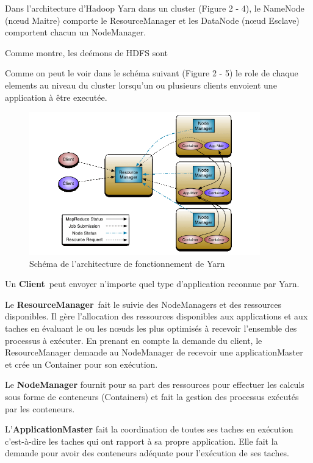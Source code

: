\documentclass[12pt,french]{book}
\begin{document}
Dans l’architecture d’Hadoop Yarn dans un cluster (Figure 2 - 4), le NameNode (nœud Maitre) comporte le ResourceManager et les DataNode (nœud Esclave) comportent chacun un NodeManager.

Comme montre, les deémons de HDFS sont

Comme on peut le voir dans le schéma suivant (Figure 2 - 5) le role de chaque elements au niveau du cluster lorsqu’un ou plusieurs clients envoient une application à être executée.

\begin{figure}[ht]
	\centering
	\includegraphics[width=10cm]{yarnArch}
	\caption[Schéma de l'architecture de fonctionnement de Yarn]{Schéma de l'architecture de fonctionnement de Yarn \footnotemark}
\end{figure}


Un \textbf{Client} peut envoyer n’importe quel type d’application reconnue par Yarn. 

Le \textbf{ResourceManager} fait le suivie des NodeManagers et des ressources disponibles.
Il gère l’allocation des ressources disponibles aux applications et aux taches en évaluant le ou les nœuds les plus optimisés à recevoir l’ensemble des processus à exécuter.
En prenant en compte la demande du client, le ResourceManager demande au NodeManager de recevoir une applicationMaster et crée un Container pour son exécution.

Le \textbf{NodeManager} fournit pour sa part des ressources pour effectuer les calculs sous forme de conteneurs (Containers) et fait la gestion des processus exécutés par les conteneurs.

L’\textbf{ApplicationMaster} fait la coordination de toutes ses taches en exécution c’est-à-dire les taches qui ont rapport à sa propre application.
Elle fait la demande pour avoir des conteneurs adéquate pour l’exécution de ses taches.
\end{document}
